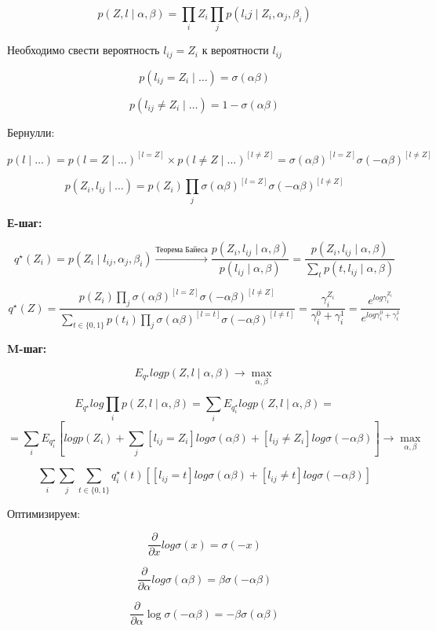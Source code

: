 \documentclass[a4paper, 12pt]{article}
\begin{document}
\[p(Z, l \mid \alpha, \beta) = 
\prod_i Z_i \prod_{j} p(l_ij \mid Z_i, \alpha_j, \beta_i)\]

Необходимо свести вероятность $l_{ij} = Z_i$ к вероятности $l_{ij}$

\[p(l_{ij} = Z_i \mid \ldots) = \sigma(\alpha\beta)\]

\[p(l_{ij} \neq Z_i \mid \ldots) = 1 - \sigma(\alpha\beta)\]

Бернулли:

\[p(l \mid \ldots) = p(l = Z \mid \ldots)^{[l = Z]} 
\times p(l \neq Z \mid \ldots)^{[l \neq Z]} =
\sigma(\alpha\beta)^{[l = Z]}\sigma(-\alpha\beta)^{[l \neq Z]}\]

\[p(Z_i, l_{ij} \mid \ldots) = 
p(Z_i)\prod_{j}\sigma(\alpha\beta)^{[l = Z]}
\sigma(-\alpha\beta)^{[l \neq Z]}\]

\textbf{Е-шаг:}

\[q^{\star}(Z_i) = p(Z_i \mid l_{ij}, \alpha_j, \beta_i) 
\xrightarrow{\textrm{Теорема Байеса}} \frac{p(Z_i, l_{ij}\mid\alpha,\beta)}
{p(l_{ij}\mid\alpha,\beta)} = \frac{p(Z_i, l_{ij}\mid\alpha,\beta)}
{\sum_{t} p(t, l_{ij}\mid\alpha,\beta)}\]

\[q^{\star}(Z) = \frac{p(Z_i)
\prod_{j}\sigma(\alpha\beta)^{[l = Z]}
\sigma(-\alpha\beta)^{[l \neq Z]}}
{\sum_{t \in \{0, 1\}} p(t_i)
\prod_{j}\sigma(\alpha\beta)^{[l = t]}
\sigma(-\alpha\beta)^{[l \neq t]}} 
= \frac{\gamma^{Z_i}_i}{\gamma^{0}_i + \gamma^{1}_i} = 
\frac{e^{log\gamma^{Z_i}_i}}
{e^{log\gamma^{0}_i + \gamma^{1}_i}}\]

\textbf{M-шаг:}

\[E_{q^{\star}} log p(Z, l \mid \alpha, \beta) 
\rightarrow \max_{\alpha, \beta}\]

\[E_{q^{\star}} log \prod_i p(Z, l \mid \alpha, \beta) = 
\sum_i E_{q^{\star}_i} logp(Z, l \mid \alpha, \beta) = \]
\[=\sum_i E_{q^{\star}_i}[logp(Z_i) + 
\sum_j [l_{ij} = Z_i] log \sigma(\alpha\beta) + 
[l_{ij} \neq Z_i] log \sigma(-\alpha\beta)] 
\rightarrow \max_{\alpha, \beta}\]

\[\sum_i \sum_j \sum_{t \in \{0, 1\}} 
q_i^{\star}(t)[[l_{ij} = t] log \sigma(\alpha\beta) + 
[l_{ij} \neq t] log \sigma(-\alpha\beta)]\]

Оптимизируем:

\[\frac{\partial}{\partial x} log\sigma(x) = \sigma(-x)\]

\[\frac{\partial}{\partial \alpha}
log\sigma(\alpha\beta)= 
\beta\sigma(-\alpha\beta)\]

\[\frac{\partial}{\partial \alpha} \log\sigma(-\alpha\beta) = 
-\beta\sigma(\alpha\beta)\]
\end{document}
